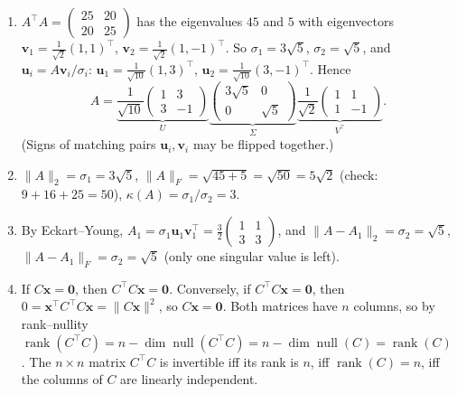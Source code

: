 \documentclass[11pt]{article}
\newcommand{\norm}[1]{\lVert #1 \rVert}
\DeclareMathOperator{\rank}{rank}
\DeclareMathOperator{\Null}{null}
\begin{document}
\begin{enumerate}[label=(\alph*)]
    \item $A^\top A = \begin{pmatrix} 25 & 20 \\ 20 & 25 \end{pmatrix}$ has the eigenvalues $45$ and $5$ with eigenvectors $\mathbf{v}_1 = \frac{1}{\sqrt 2}(1, 1)^\top$, $\mathbf{v}_2 = \frac{1}{\sqrt 2}(1, -1)^\top$. So $\sigma_1 = 3\sqrt 5$, $\sigma_2 = \sqrt 5$, and $\mathbf{u}_i = A\mathbf{v}_i/\sigma_i$: $\mathbf{u}_1 = \frac{1}{\sqrt{10}}(1, 3)^\top$, $\mathbf{u}_2 = \frac{1}{\sqrt{10}}(3, -1)^\top$. Hence
    \[A = \underbrace{\frac{1}{\sqrt{10}}\begin{pmatrix} 1 & 3 \\ 3 & -1 \end{pmatrix}}_{U}\underbrace{\begin{pmatrix} 3\sqrt 5 & 0 \\ 0 & \sqrt 5 \end{pmatrix}}_{\Sigma}\underbrace{\frac{1}{\sqrt 2}\begin{pmatrix} 1 & 1 \\ 1 & -1 \end{pmatrix}}_{V^\top}.\]
    (Signs of matching pairs $\mathbf{u}_i, \mathbf{v}_i$ may be flipped together.)
    \item $\norm{A}_2 = \sigma_1 = 3\sqrt 5$, $\norm{A}_F = \sqrt{45 + 5} = \sqrt{50} = 5\sqrt 2$ (check: $9 + 16 + 25 = 50$), $\kappa(A) = \sigma_1/\sigma_2 = 3$.
    \item By Eckart--Young, $A_1 = \sigma_1\mathbf{u}_1\mathbf{v}_1^\top = \frac{3}{2}\begin{pmatrix} 1 & 1 \\ 3 & 3 \end{pmatrix}$, and $\norm{A - A_1}_2 = \sigma_2 = \sqrt 5$, $\norm{A - A_1}_F = \sigma_2 = \sqrt 5$ (only one singular value is left).
    \item If $C\mathbf{x} = \mathbf{0}$, then $C^\top C\mathbf{x} = \mathbf{0}$. Conversely, if $C^\top C\mathbf{x} = \mathbf{0}$, then $0 = \mathbf{x}^\top C^\top C\mathbf{x} = \norm{C\mathbf{x}}^2$, so $C\mathbf{x} = \mathbf{0}$. Both matrices have $n$ columns, so by rank--nullity $\rank(C^\top C) = n - \dim\Null(C^\top C) = n - \dim\Null(C) = \rank(C)$. The $n \times n$ matrix $C^\top C$ is invertible iff its rank is $n$, iff $\rank(C) = n$, iff the columns of $C$ are linearly independent.
\end{enumerate}
\end{document}
